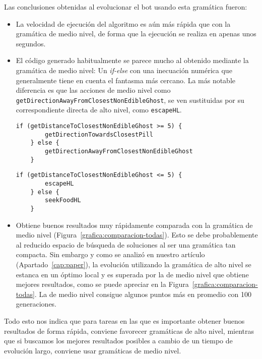 Las conclusiones obtenidas al evolucionar el bot usando esta gramática fueron:
\begin{itemize}
\item La velocidad de ejecución del algoritmo es aún más rápida que con la gramática de medio nivel, de forma que la ejecución se realiza en apenas unos segundos.

\item El código generado habitualmente se parece mucho al obtenido mediante la gramática de medio nivel: Un \textit{if-else} con una inecuación numérica que generalmente tiene en cuenta el fantasma más cercano. La más notable diferencia es que las acciones de medio nivel como \texttt{getDirectionAwayFromClosestNonEdibleGhost}, se ven sustituidas por su correspondiente directa de alto nivel, como \texttt{escapeHL}.
\begin{lstlisting}[caption={Código del mejor individuo obtenido en una población evolucionada con la gramática de medio nivel.}]
    if (getDistanceToClosestNonEdibleGhost >= 5) {
        getDirectionTowardsClosestPill
    } else {
        getDirectionAwayFromClosestNonEdibleGhost
    }
\end{lstlisting}

\begin{lstlisting}[caption={Código del mejor individuo obtenido en una población evolucionada con la gramática de alto nivel.}]
    if (getDistanceToClosestNonEdibleGhost <= 5) {
        escapeHL
    } else {
        seekFoodHL
    }
\end{lstlisting}

\item Obtiene buenos resultados muy rápidamente comparada con la gramática de medio nivel (Figura~\ref{grafica:comparacion-todas}). Esto se debe probablemente al reducido espacio de búsqueda de soluciones al ser una gramática tan compacta. Sin embargo y como se analizó en nuestro artículo (Apartado~\ref{cap:paper}),  la evolución utilizando la gramática de alto nivel se estanca en un óptimo local y es superada por la de medio nivel que obtiene mejores resultados, como se puede apreciar en la Figura~\ref{grafica:comparacion-todas}. La de medio nivel consigue algunos puntos más en promedio con 100 generaciones.
\end{itemize}

Todo esto nos indica que para tareas en las que es importante obtener buenos resultados de forma rápida, conviene favorecer gramáticas de alto nivel, mientras que si buscamos los mejores resultados posibles a cambio de un tiempo de evolución largo, conviene usar gramáticas de medio nivel.

